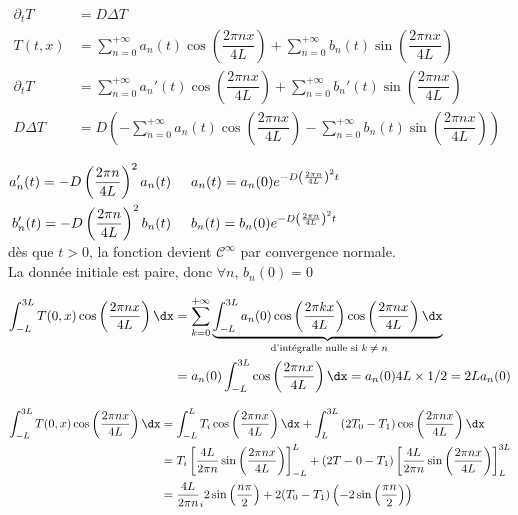 \documentclass[12pt,a4paper]{article}
\begin{document}
\noindent$\begin{aligned}
	\partial_t T &=D\Delta T\\
	T(t,x) &= \displaystyle\sum_{n=0}^{+\infty} a_n(t)\cos\left(\dfrac{2\pi nx}{4L}\right) + \sum_{n=0}^{+\infty} b_n(t)\sin\left(\dfrac{2\pi nx}{4L}\right)\\
	\partial_t T &= \sum_{n=0}^{+\infty} a_n'(t)\cos\left(\dfrac{2\pi nx}{4L}\right) + \sum_{n=0}^{+\infty} b_n'(t)\sin\left(\dfrac{2\pi nx}{4L}\right)\\
	D\Delta T &=  D\left(-\sum_{n=0}^{+\infty} a_n(t)\cos\left(\dfrac{2\pi nx}{4L}\right) - \sum_{n=0}^{+\infty} b_n(t)\sin\left(\dfrac{2\pi nx}{4L}\right)\right)
\end{aligned}$\\
\par$\begin{aligned}
	a_n'(t) = -D\left(\frac{2\pi n}{4L}\right)^2a_n(t) & \hspace{.5cm}a_n(t) = a_n(0)e^{-D\left(\frac{2\pi n}{4L}\right)^2t} \\
	b_n'(t) = -D\left(\frac{2\pi n}{4L}\right)^2b_n(t) & \hspace{.5cm}b_n(t) = b_n(0)e^{-D\left(\frac{2\pi n}{4L}\right)^2t}
\end{aligned}$\\

dès que $t>0$, la fonction devient $\mathcal C^\infty$ par convergence normale.\\

La donnée initiale est paire, donc $\forall n$, $b_n(0) = 0$

\vspace{-.5cm}

\[
\begin{aligned}
	\displaystyle\int_{-L}^{3L}T(0,x)\cos\left(\dfrac{2\pi n x}{4L}\right)\dx &= \sum_{k=0}^{+\infty}\underbrace{\int_{-L}^{3L}a_n(0)\cos\left(\dfrac{2\pi kx}{4L}\right)\cos\left(\dfrac{2\pi nx}{4L}\right)\dx}_{\text{ d'intégralle nulle si $k\not=n$}} \\
	&= a_n(0)\int_{-L}^{3L}\cos\left(\dfrac{2\pi nx}{4L}\right)\dx = a_n(0) 4L\times 1/2 = 2La_n(0)
\end{aligned}
\]

$\begin{aligned}
	\displaystyle\int_{-L}^{3L} T(0,x)\cos\left(\dfrac{2\pi nx}{4L}\right)\dx &= \int_{-L}^LT_i \cos\left(\dfrac{2\pi nx}{4L}\right)\dx + \int_L^{3L} \left(2T_0-T_1\right)\cos\left(\dfrac{2\pi nx}{4L}\right)\dx\\
	&=T_i\left[\dfrac{4L}{2\pi n}\sin\left(\dfrac{2\pi nx}{4L}\right)\right]_{-L}^L+(2T-0-T_1)\left[\dfrac{4L}{2\pi n}\sin\left(\dfrac{2\pi nx}{4L}\right)\right]_L^{3L}\\
	&=\dfrac{4L}{2\pi n}_i2\sin\left(\dfrac{n\pi}2\right)+2(T_0-T_1)\left(-2\sin\left(\dfrac{\pi n}2\right)\right)
\end{aligned}$\\
\end{document}
